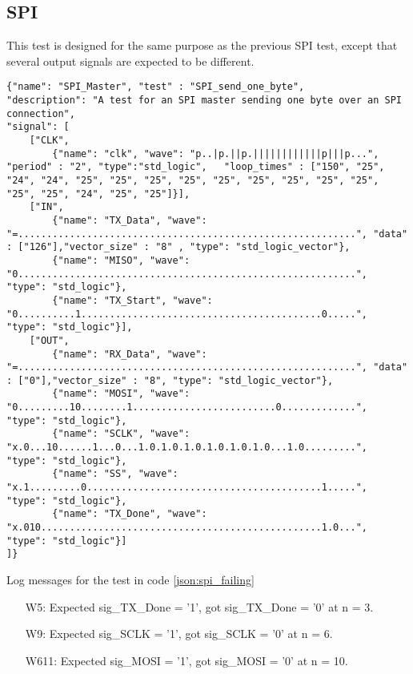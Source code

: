 \subsection{SPI}
This test is designed for the same purpose as the previous SPI test, except that several output signals are expected to be different.
\begin{lstlisting}[style=json, caption={Failing functionality test for the SPI design in appendix \ref{appendix:spi}}, label={json:spi_failing}]
{"name": "SPI_Master", "test" : "SPI_send_one_byte",
"description": "A test for an SPI master sending one byte over an SPI connection",
"signal": [
	["CLK",
		{"name": "clk", "wave": "p..|p.||p.||||||||||||p|||p...", "period" : "2", "type":"std_logic",	"loop_times" : ["150", "25", "24", "24", "25", "25", "25", "25", "25", "25", "25", "25", "25", "25", "25", "24", "25", "25"]}],
	["IN",
		{"name": "TX_Data", "wave": "=...........................................................", "data" : ["126"],"vector_size" : "8" , "type": "std_logic_vector"},
		{"name": "MISO", "wave": "0...........................................................", "type": "std_logic"},
		{"name": "TX_Start", "wave": "0..........1..........................................0.....", "type": "std_logic"}],
	["OUT",
		{"name": "RX_Data", "wave": "=...........................................................", "data" : ["0"],"vector_size" : "8", "type": "std_logic_vector"},
		{"name": "MOSI", "wave": "0.........10........1.........................0.............", "type": "std_logic"},
		{"name": "SCLK", "wave": "x.0...10......1...0...1.0.1.0.1.0.1.0.1.0.1.0...1.0.........", "type": "std_logic"},
		{"name": "SS", "wave": "x.1.........0.........................................1.....", "type": "std_logic"},
		{"name": "TX_Done", "wave": "x.010.................................................1.0...", "type": "std_logic"}]
]}
\end{lstlisting}
\begin{customenv}
	\caption{Log messages for the test in code \ref{json:spi_failing}}
	\begin{itemize}
		\item [W5:] Expected sig\_TX\_Done =  '1',  got sig\_TX\_Done =  '0' at n = 3.
		\item [W9:] Expected sig\_SCLK =  '1',  got sig\_SCLK =  '0' at n = 6.
		\item [W611:] Expected sig\_MOSI =  '1',  got sig\_MOSI =  '0' at n = 10.
	\end{itemize}
\end{customenv}\clearpage